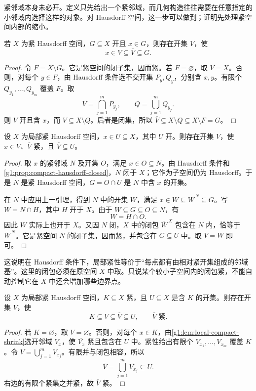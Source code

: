 紧邻域本身未必开。定义只先给出一个紧邻域，而几何构造往往需要在任意指定的小邻域内选择这样的对象。对 Hausdorff 空间，这一步可以做到；证明先处理紧空间内部的缩小。

\begin{lemma}\label{g1:lem:compact-hausdorff-shrink}
	若 \(X\) 为紧 Hausdorff 空间，\(G\subseteq X\) 开且 \(x\in G\)，则存在开集 \(V\)，使
	\[
		x\in V\subseteq\overline V\subseteq G.
	\]
\end{lemma}
\begin{proof}
	令 \(F=X\setminus G\)。它是紧空间的闭子集，因而紧。若 \(F=\varnothing\)，取 \(V=X\)。否则，对每个 \(y\in F\)，由 Hausdorff 条件选不交开集 \(P_y,Q_y\)，分别含 \(x,y\)。有限个 \(Q_{y_1},\ldots,Q_{y_m}\) 覆盖 \(F\)。取
	\[
		V=\bigcap_{j=1}^mP_{y_j},\qquad Q=\bigcup_{j=1}^mQ_{y_j}.
	\]
	则 \(V\) 开且含 \(x\)，而 \(V\subseteq X\setminus Q\)。后者是闭集，所以 \(\overline V\subseteq X\setminus Q\subseteq X\setminus F=G\)。
\end{proof}

\begin{lemma}\label{g1:lem:local-compact-shrink}
	设 \(X\) 为局部紧 Hausdorff 空间，\(x\in U\subseteq X\)，其中 \(U\) 开。则存在开集 \(V\)，使 \(x\in V\)、\(\overline V\) 紧，且 \(\overline V\subseteq U\)。
\end{lemma}
\begin{proof}
	取 \(x\) 的紧邻域 \(N\) 及开集 \(O\)，满足 \(x\in O\subseteq N\)。由 Hausdorff 条件和\cref{g1:prop:compact-hausdorff-closed}，\(N\) 闭于 \(X\)；它作为子空间仍为 Hausdorff。于是 \(N\) 是紧 Hausdorff 空间，\(G=O\cap U\) 是 \(N\) 中含 \(x\) 的开集。

	在 \(N\) 中应用上一引理，得到 \(N\) 中的开集 \(W\)，满足 \(x\in W\subseteq\overline W^{\,N}\subseteq G\)。写 \(W=N\cap H\)，其中 \(H\) 开于 \(X\)。由于 \(W\subseteq G\subseteq O\subseteq N\)，有
	\[
		W=H\cap O.
	\]
	因此 \(W\) 实际上也开于 \(X\)。又因 \(N\) 闭，\(X\) 中的闭包 \(\overline W^{\,X}\) 包含在 \(N\) 内，恰等于 \(\overline W^{\,N}\)。它是紧空间 \(N\) 的闭子集，因而紧，并包含在 \(G\subseteq U\) 中。取 \(V=W\) 即可。
\end{proof}

这说明在 Hausdorff 条件下，局部紧性等价于“每点都有由相对紧开集组成的邻域基”。这里的闭包必须在原空间 \(X\) 中取。只说某个较小子空间内的闭包紧，不能自动控制它在 \(X\) 中还会增加哪些边界点。

\begin{proposition}\label{g1:prop:compact-neighborhood-shrink}
	设 \(X\) 为局部紧 Hausdorff 空间，\(K\subseteq X\) 紧，且 \(U\subseteq X\) 是含 \(K\) 的开集。则存在开集 \(V\)，使
	\[
		K\subseteq V\subseteq\overline V\subseteq U,\qquad \overline V\text{ 紧}.
	\]
\end{proposition}
\begin{proof}
	若 \(K=\varnothing\)，取 \(V=\varnothing\)。否则，对每个 \(x\in K\)，由\cref{g1:lem:local-compact-shrink}选开邻域 \(V_x\)，使 \(\overline{V_x}\) 紧且包含在 \(U\) 中。紧性给出有限个 \(V_{x_1},\ldots,V_{x_m}\) 覆盖 \(K\)。令 \(V=\bigcup_{j=1}^mV_{x_j}\)。有限并与闭包相容，所以
	\[
		\overline V=\bigcup_{j=1}^m\overline{V_{x_j}}\subseteq U.
	\]
	右边的有限个紧集之并紧，故 \(\overline V\) 紧。
\end{proof}


